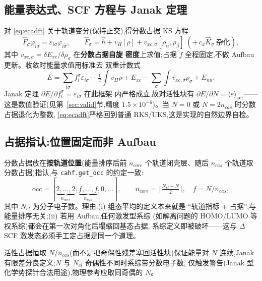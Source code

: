 \documentclass[11pt,a4paper]{ctexart}
\begin{document}
\subsection{能量表达式、SCF 方程与 Janak 定理}

对 \eqref{eq:ecadft} 关于轨道变分(保持正交),得分数占据 KS 方程
\begin{equation}
  \hat F_\sigma \varphi_{i\sigma} = \varepsilon_{i\sigma} \varphi_{i\sigma},
  \qquad
  \hat F_\sigma = \hat h + v_H[\rho] + v_{xc,\sigma}[\rho_\alpha,\rho_\beta]
  \;(+\,c_x \hat K_\sigma \ \text{杂化}),
\end{equation}
其中 $v_{xc,\sigma} = \delta E_{xc}/\delta \rho_\sigma$ 在\textbf{分数占据自旋
密度}上求值;占据 $f$ 全程固定,不做 Aufbau 更新。收敛时能量求值用标准去
双重计数式
\begin{equation}
  E = \sum_{i\sigma} f_i^\sigma \varepsilon_{i\sigma}
    - \tfrac12 \int v_H \rho
    + E_{xc} - \sum_\sigma \int v_{xc,\sigma} \rho_\sigma + E_{nn} .
\end{equation}
Janak 定理 $\partial E/\partial f_i^\sigma = \varepsilon_{i\sigma}$ 在此框架
内严格成立,故对活性块有 $\partial E/\partial N = \langle \varepsilon
\rangle_{\mathrm{act}}$——这是数值验证(见第~\ref{sec:valid}节,精度
$1.5\times10^{-6}$)。当 $N=0$ 或 $N=2n_{cas}$ 时分数占据退化为整数,
\eqref{eq:ecadft}严格回到普通 RKS/UKS,这是实现的自然边界自检。

\subsection{占据指认:位置固定而非 Aufbau}\label{sec:position}

分数占据放在\textbf{按轨道位置}(能量排序后前 $n_{core}$ 个轨道闭壳层、随后
$n_{cas}$ 个轨道取分数占据)指认,与 \texttt{cahf.get\_occ} 的约定一致:
\begin{equation}
  \mathrm{occ} = [\underbrace{2,\dots,2}_{n_{core}},
                  \underbrace{f,\dots,f}_{n_{cas}}, 0,\dots],
  \qquad
  n_{core} = \Big\lfloor \tfrac{N_{el}-N}{2} \Big\rceil,
  \quad f = N/n_{cas},
\end{equation}
其中 $N_{el}$ 为分子电子数。理由:(i) 组态平均的定义本来就是
``轨道指标 + 占据'',与能量排序无关;(ii) 若用 Aufbau,任何激发型系综
(如解离问题的 HOMO/LUMO 等权系综)都会在第一次对角化后塌缩回基态占据,
系综定义即被破坏——这与 $\Delta$SCF 激发态必须手工定占据是同一个道理。

活性占据恒取 $N/n_{cas}$(而不是把奇偶性残差塞回活性块)保证能量对 $N$
连续,Janak 有限差分良定义;$N$ 与 $N_{el}$ 奇偶性不同时系综带分数电子数,
仅触发警告(Janak 型化学势探针合法用途),物理参考应取同奇偶的 $N$。
\end{document}
